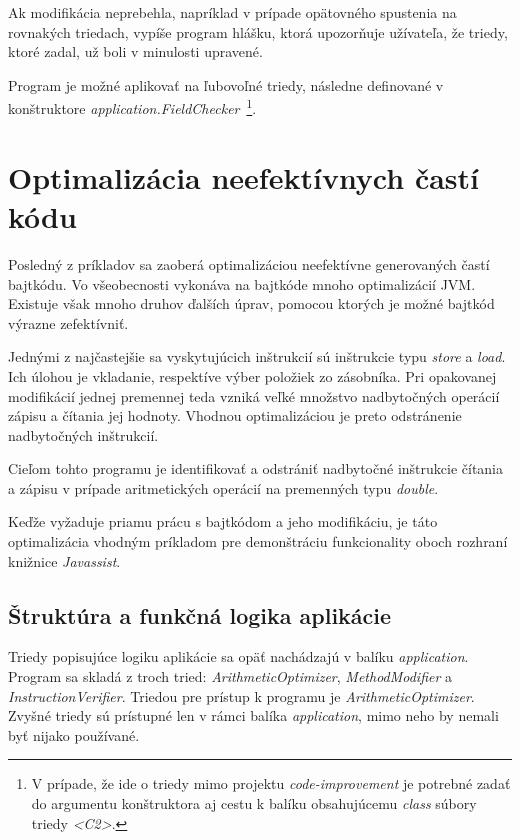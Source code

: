 \documentclass[11pt,final,oneside]{fithesis}
\begin{document}
Ak modifikácia neprebehla, napríklad v prípade opätovného spustenia na 
rovnakých triedach, vypíše program hlášku, ktorá upozorňuje užívateľa, že 
triedy, ktoré zadal, už boli v minulosti upravené.

Program je možné aplikovať na ľubovoľné triedy, následne definované v
 konštruktore
\textit{application.FieldChecker}~\footnote{V prípade, že ide o triedy mimo 
projektu \textit{code-improvement} je potrebné zadať do argumentu konštruktora 
aj cestu k balíku obsahujúcemu \textit{class} súbory triedy \textit{<C2>}.}.

\section{Optimalizácia neefektívnych častí kódu}
Posledný z príkladov sa zaoberá optimalizáciou neefektívne generovaných častí 
bajtkódu. Vo všeobecnosti vykonáva na bajtkóde mnoho optimalizácií JVM. 
Existuje však mnoho druhov ďalších úprav, pomocou ktorých je možné bajtkód 
výrazne zefektívniť.

Jednými z najčastejšie sa vyskytujúcich inštrukcií sú inštrukcie typu 
\textit{store} a \textit{load}. Ich úlohou je vkladanie, respektíve výber 
položiek zo zásobníka. Pri opakovanej modifikácií jednej premennej teda vzniká 
veľké množstvo nadbytočných operácií zápisu a čítania jej hodnoty. Vhodnou 
optimalizáciou je preto odstránenie nadbytočných inštrukcií.

Cieľom tohto programu je identifikovať a odstrániť nadbytočné inštrukcie 
čítania a zápisu v prípade aritmetických operácií na premenných typu 
\textit{double}. 

Keďže vyžaduje priamu prácu s bajtkódom a jeho modifikáciu, je táto 
optimalizácia vhodným príkladom pre demonštráciu funkcionality oboch rozhraní 
knižnice \textit{Javassist}.

\subsection{Štruktúra a funkčná logika aplikácie}
Triedy popisujúce logiku aplikácie sa opäť nachádzajú v balíku 
\textit{application}. Program sa skladá z troch tried: 
\textit{ArithmeticOptimizer}, \textit{MethodModifier} a 
\textit{InstructionVerifier}. Triedou pre prístup k programu je 
\textit{ArithmeticOptimizer}. Zvyšné triedy sú prístupné len v rámci balíka 
\textit{application}, mimo neho by nemali byť nijako používané.
\end{document}
